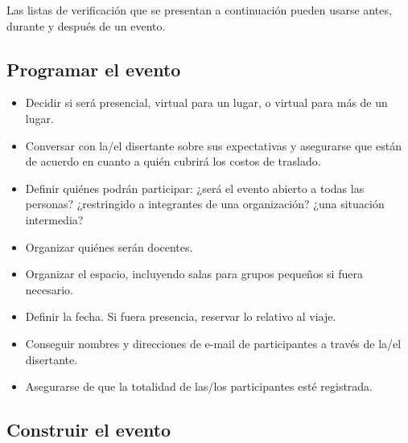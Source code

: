 
Las listas de verificación que se presentan a continuación pueden usarse antes, durante y después de un evento.

\subsection*{Programar el evento}

\begin{itemize}

\item
  Decidir si será presencial,
  virtual para un lugar,
  o virtual para más de un lugar.

\item
  Conversar con la/el disertante sobre sus expectativas
  y asegurarse que están de acuerdo en cuanto a quién cubrirá los costos de traslado.

\item
  Definir quiénes podrán participar:
  ¿será el evento abierto a todas las personas?
  ¿restringido a integrantes de una organización?
  ¿una situación intermedia?

\item
  Organizar quiénes serán docentes.

\item
  Organizar el espacio, incluyendo salas para grupos pequeños si fuera necesario.

\item
  Definir la fecha.
  Si fuera presencia, reservar lo relativo al viaje.

\item
  Conseguir nombres y direcciones de e-mail de participantes a través de la/el disertante.

\item
  Asegurarse de que la totalidad de las/los participantes esté registrada.

\end{itemize}

\subsection*{Construir el evento}

